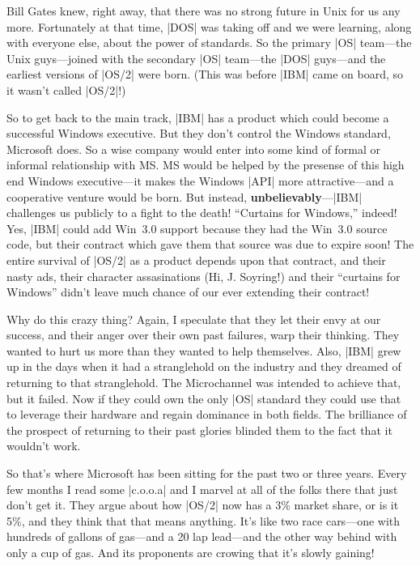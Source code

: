 Bill Gates knew, right away, that there was no
strong future in Unix for us any more.  Fortunately at that time, |DOS|
was taking off and we were learning, along with everyone else, about
the power of standards.  So the primary |OS| team---the Unix guys---joined
with the secondary |OS| team---the |DOS| guys---and the earliest versions
of |OS/2| were born.  (This was before |IBM| came on board, so it wasn't called 
|OS/2|!)

So to get back to the main track, |IBM| has a product which could
become a successful Windows executive.  But they don't control the
Windows standard, Microsoft does.  So a wise company would enter into
some kind of formal or informal relationship with MS.  MS would be
helped by the presense of this high end Windows executive---it makes
the Windows |API| more attractive---and a cooperative venture would be
born.  But instead, {\bf unbelievably}---|IBM| challenges us publicly
to a fight to the death!  ``Curtains for Windows,'' indeed!  Yes,
|IBM| could add Win~3.0 support because they had the Win~3.0 source
code, but their contract which gave them that source was due to expire
soon!  The entire survival of |OS/2| as a product depends upon that
contract, and their nasty ads, their character assasinations (Hi,
J. Soyring!)  and their ``curtains for Windows'' didn't leave much
chance of our ever extending their contract!

Why do this crazy thing?  Again, I speculate that they let their envy
at our success, and their anger over their own past failures, warp their
thinking.  They wanted to hurt us more than they wanted to help themselves.
Also, |IBM| grew up in the days when it had a stranglehold on the industry
and they dreamed of returning to that stranglehold.  The Microchannel
was intended to achieve that, but it failed.  Now if they could own the
only |OS| standard they could use that to leverage their hardware and
regain dominance in both fields.  The brilliance of the prospect of
returning to their past glories blinded them to the fact that it wouldn't
work.

So that's where Microsoft has been sitting for the past two or three
years.  Every few months I read some |c.o.o.a| and I marvel at all of
the folks there that just don't get it.  They argue about how |OS/2| now has
a 3\% market share, or is it 5\%, and they think that that means anything.
It's like two race cars---one with hundreds of gallons of gas---and
a 20 lap lead---and the other way behind with only a cup of gas.  And
its proponents are crowing that it's slowly gaining!

